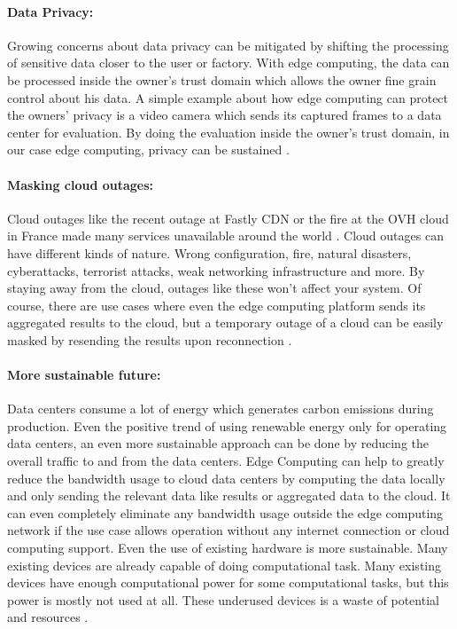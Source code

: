 \paragraph{Data Privacy:} Growing concerns about data privacy can be mitigated by shifting the processing of sensitive data closer to the user or factory. With edge computing, the data can be processed inside the owner's trust domain which allows the owner fine grain control about his data. A simple example about how edge computing can protect the owners' privacy is a video camera which sends its captured frames to a data center for evaluation. By doing the evaluation inside the owner's trust domain, in our case edge computing, privacy can be sustained \cite{Shi2016a}.

\paragraph{Masking cloud outages:} Cloud outages like the recent outage at Fastly CDN or the fire at the OVH cloud in France made many services unavailable around the world \cite{Rockwell2021} \cite{Holland2021}. Cloud outages can have different kinds of nature. Wrong configuration, fire, natural disasters, cyberattacks, terrorist attacks, weak networking infrastructure and more. By staying away from the cloud, outages like these won't affect your system. Of course, there are use cases where even the edge computing platform sends its aggregated results to the cloud, but a temporary outage of a cloud can be easily masked by resending the results upon reconnection \cite{Shi2016a}.

\paragraph{More sustainable future:} Data centers consume a lot of energy which generates carbon emissions during production. Even the positive trend of using renewable energy only for operating data centers, an even more sustainable approach can be done by reducing the overall traffic to and from the data centers. Edge Computing can help to greatly reduce the bandwidth usage to cloud data centers by computing the data locally and only sending the relevant data like results or aggregated data to the cloud. It can even completely eliminate any bandwidth usage outside the edge computing network if the use case allows operation without any internet connection or cloud computing support. Even the use of existing hardware is more sustainable. Many existing devices are already capable of doing computational task. Many existing devices have enough computational power for some computational tasks, but this power is mostly not used at all. These underused devices is a waste of potential and resources \cite{ObjectBoxLimited2021} \cite{Adib}.


